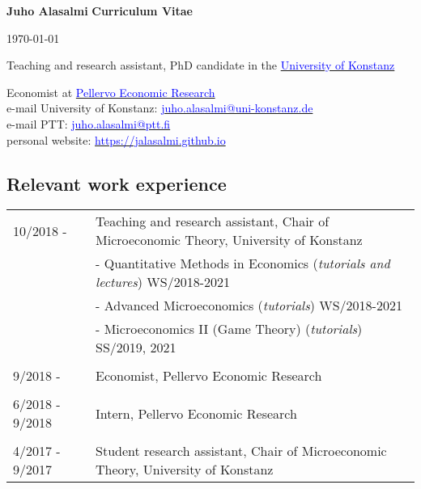 \documentclass[16pt]{article}
\begin{document}
\noindent \textbf{Juho Alasalmi} \hfill{\textbf{Curriculum Vitae}} \par
\noindent  \hfill{\today} \par
\noindent Teaching and research assistant, PhD candidate in the \href{https://www.wiwi.uni-konstanz.de/goldluecke/team/academic-staff/doctoral-students/}{\textcolor{blue}{University of Konstanz}} \par
\noindent Economist at \href{http://www.ptt.fi/}{\textcolor{blue}{Pellervo Economic Research}} \\

\noindent e-mail University of Konstanz: \href{mailto: juho.alasalmi@uni-konstanz.de}{\textcolor{blue}{juho.alasalmi@uni-konstanz.de}} \\
\noindent e-mail PTT: \href{mailto: juho.alasalmi@ptt.fi}{\textcolor{blue}{juho.alasalmi@ptt.fi}}\\
\noindent personal website: \href{https://jalasalmi.github.io}{\textcolor{blue}{https://jalasalmi.github.io}}

\subsection*{Relevant work experience}
\begin{tabular}{@{}p{1.5in}p{5in}}
10/2018 -            & Teaching and research assistant, Chair of Microeconomic Theory,  University of Konstanz \\
                          &   -  Quantitative Methods in Economics (\textit{tutorials and lectures}) WS/2018-2021  \\
                          &   -  Advanced Microeconomics (\textit{tutorials}) WS/2018-2021 \\   
                          &   -  Microeconomics II (Game Theory) (\textit{tutorials}) SS/2019, 2021 \\   
                                                 
\\
9/2018 -            & Economist, Pellervo Economic Research\\

\\
6/2018 - 9/2018 & Intern, Pellervo Economic Research\\

\\
4/2017 - 9/2017 & Student research assistant, Chair of Microeconomic Theory,  University of Konstanz\\
                           
\end{tabular}
\end{document}
